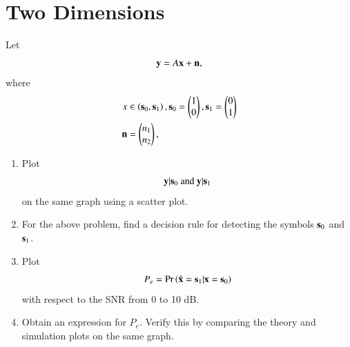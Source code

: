 \documentclass[journal,12pt,twocolumn]{IEEEtran}
\renewcommand\thesection{\arabic{section}}
\begin{document}
\section{Two Dimensions}
Let 
\begin{equation}
\mathbf{y} = A\mathbf{x} + \mathbf{n},
\end{equation}
where 
\begin{align}
x &\in \left(\mathbf{s}_0,\mathbf{s}_1\right), 
\mathbf{s}_0 = 
\begin{pmatrix}
1 
\\
0
\end{pmatrix},
\mathbf{s}_1 = 
\begin{pmatrix}
0 
\\
1
\end{pmatrix}
\\
\mathbf{n} &= 
\begin{pmatrix}
n_1
\\
n_2
\end{pmatrix},
\end{align}
%
\begin{enumerate}[label=\thesection.\arabic*
,ref=\thesection.\theenumi]

\item
\label{ch5_fsk}
Plot 
%
\begin{equation}
\mathbf{y}|\mathbf{s}_0 \text{ and } \mathbf{y}|\mathbf{s}_1
\end{equation}
%
on the same graph using a scatter plot.

%
\item
For the above problem, find a decision rule for detecting the symbols $\mathbf{s}_0 $ and $\mathbf{s}_1$.

%
\item
Plot 
\begin{equation} 
P_e = \Pr\left(\hat{\mathbf{x}} = \mathbf{s}_1|\mathbf{x} = \mathbf{s}_0\right)
\end{equation}
with respect to the SNR from 0 to 10 dB.

%
\item
Obtain an expression for $P_e$. Verify this by comparing the theory and simulation plots on the same graph.

%
		\end{enumerate}
\end{document}
